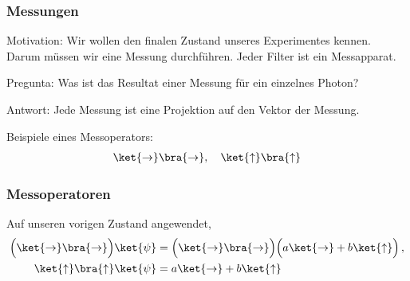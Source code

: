 \documentclass{beamer}
\begin{document}
\begin{frame}
\frametitle{Messungen}
Motivation: Wir wollen den finalen Zustand unseres Experimentes kennen.  Darum m\"ussen wir eine Messung durchf\"uhren.  Jeder Filter ist ein Messapparat.

\bigskip
Pregunta: Was ist das Resultat einer Messung f\"ur ein einzelnes Photon?

\bigskip
Antwort: Jede Messung ist eine Projektion auf den Vektor der Messung.

\bigskip
Beispiele eines Messoperators:
\begin{align*}
    \ket{\rightarrow}\bra{\rightarrow},
    \quad
    \ket{\uparrow}\bra{\uparrow}
\end{align*}
\end{frame}

\begin{frame}
\frametitle{Messoperatoren}
Auf unseren vorigen Zustand angewendet,
\begin{align*}
    \Big(\ket{\rightarrow}\bra{\rightarrow}\Big) \ket{\psi}
    &=
    \Big(\ket{\rightarrow}\bra{\rightarrow}\Big)
    \Big(a\ket{\to} + b\ket{\uparrow}\Big)\,,
    \\
    \ket{\uparrow}\bra{\uparrow}
            \ket{\psi} &= a\ket{\to} + b\ket{\uparrow}
\end{align*}
\end{frame}
\end{document}
